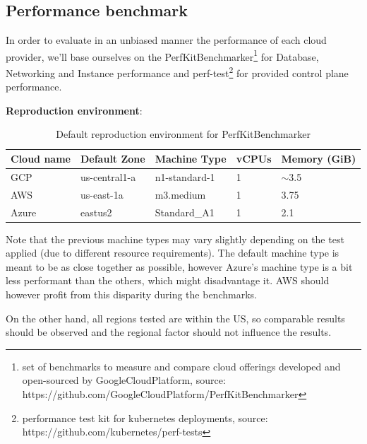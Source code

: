 \documentclass[11pt]{article}
\begin{document}
\subsection{Performance benchmark}

\hspace{5mm} In order to evaluate in an unbiased manner the performance of each cloud provider, we'll base ourselves on the PerfKitBenchmarker\footnote{set of benchmarks to measure and compare cloud offerings developed and open-sourced by GoogleCloudPlatform, source: https://github.com/GoogleCloudPlatform/PerfKitBenchmarker} for Database, Networking and Instance performance and perf-test\footnote{performance test kit for kubernetes deployments, source: https://github.com/kubernetes/perf-tests} for provided control plane performance.

\textbf{Reproduction environment}:

\begin{table}[h]
\centering
\begin{tabular}{|l|l|l|l|l|}
\hline
\textbf{Cloud name} & \textbf{Default Zone} & \textbf{Machine Type} & \multicolumn{1}{c|}{\textbf{vCPUs}} & \multicolumn{1}{c|}{\textbf{Memory (GiB)}} \\ \hline
GCP                 & us-central1-a         & n1-standard-1         & 1                                   & $\sim$3.5                                  \\ \hline
AWS                 & us-east-1a            & m3.medium             & 1                                   & 3.75                                       \\ \hline
Azure               & eastus2               & Standard\_A1          & 1                                   & 2.1                                        \\ \hline
\end{tabular}
\caption{Default reproduction environment for PerfKitBenchmarker}
\end{table}

Note that the previous machine types may vary slightly depending on the test applied (due to different resource requirements). The default machine type is meant to be as close together as possible, however Azure's machine type is a bit less performant than the others, which might disadvantage it. AWS should however profit from this disparity during the benchmarks.

On the other hand, all regions tested are within the US, so comparable results should be observed and the regional factor should not influence the results.
\end{document}
